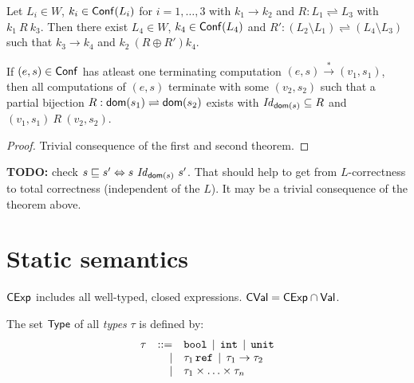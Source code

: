 \documentclass[12pt,a4paper]{article}
\newcommand{\CExp}{\sstyle{CExp}}
\newcommand{\CVal}{\sstyle{CVal}}
\newcommand{\Conf}{\sstyle{Conf}}
\begin{document}
\begin{corollary}
  Let $L_i\in W$, $k_i\in\Conf(L_i)$ for $i=1,\ldots,3$ with $k_1 \to k_2$ and $R: L_1 \rightleftharpoons L_3$ with
  $k_1\ R\ k_3$. Then there exist $L_4\in W$, $k_4 \in \Conf(L_4)$ and
  $R': (L_2 \setminus L_1) \rightleftharpoons (L_4 \setminus L_3)$ such that $k_3 \to k_4$
  and $k_2\ (R \oplus R') k_4$.
\end{corollary}

\begin{corollary}
  If $(e,s)\in\Conf$ has atleast one terminating computation $(e,s) \xrightarrow* (v_1,s_1)$, then all computations
  of $(e,s)$ terminate with some $(v_2,s_2)$ such that a partial bijection $R:\mathsf{dom}(s_1)\rightleftharpoons\mathsf{dom}(s_2)$
  exists with $\mathit{Id}_{\mathsf{dom}(s)} \subseteq R$ and $(v_1,s_1)\ R\ (v_2,s_2)$.
\end{corollary}

\begin{proof}
  Trivial consequence of the first and second theorem.
\end{proof}

{\bf TODO:} check $s \sqsubseteq s' \Leftrightarrow s\ \Id_{\dom{s}}\ s'$.
That should help to get from $L$-correctness to total correctness (independent of the $L$). It may be a trivial
consequence of the theorem above.



\section{Static semantics}

$\CExp$ includes all well-typed, closed expressions. $\CVal = \CExp \cap \Val$.

\begin{definition}[Types]
  The set $\mathsf{Type}$ of all {\em types} $\tau$ is defined by:
  \[\begin{array}{rrlll}
  \tau & ::= & \mathtt{bool} \,\mid\, \mathtt{int} \,\mid\, \mathtt{unit}
  \\ & \mid & \tau_1\,\mathtt{ref} \,\mid\, \tau_1\to\tau_2
  \\ & \mid & \tau_1 \times \ldots \times \tau_n
  \end{array}\]
\end{definition}

\end{document}
